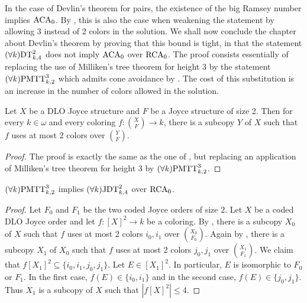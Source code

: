In the case of Devlin's theorem for pairs, the existence of the big Ramsey number implies $\mathrm{ACA}_0$. By , this is also the case when weakening the statement by allowing 3 instead of 2 colors in the solution.  We shall now conclude the chapter about Devlin's theorem by proving that this bound is tight, in that the statement $(\forall k)\mathrm{DT}^{2}_{k, 4}$ does not imply $\mathrm{ACA}_0$ over $\mathrm{RCA}_0$. The proof consists essentially of replacing the use of Milliken's tree theorem for height 3 by the statement $(\forall k)\mathrm{PMTT}^{3}_{k,2}$ which admits cone avoidance by . The cost of this substitution is an increase in the number of colors allowed in the solution.

\begin{theorem}\label{thm:dt2to4-one-embedding-type-cone-avoidance}
Let $X$ be a DLO Joyce structure and $F$ be a Joyce structure of size 2. Then for every $k \in \omega$ and every coloring $f: {X \choose F} \to k$,
there is a subcopy $Y$ of $X$ such that $f$ uses at most 2 colors over ${Y \choose F}$.
\end{theorem}
\begin{proof}
The proof is exactly the same as the one of ,
but replacing an application of Milliken's tree theorem for height 3 by
$(\forall k)\mathrm{PMTT}^{3}_{k,2}$.
\end{proof}

\begin{theorem}\label{thm:pmt-to-dt-more-colors}
$(\forall k)\mathrm{PMTT}^{3}_{k,2}$ implies $(\forall k)\mathrm{JDT}^{2}_{k, 4}$ over $\mathrm{RCA}_0$.
\end{theorem}
\begin{proof}
Let $F_0$ and $F_1$ be the two coded Joyce orders of size $2$.
Let $X$ be a coded DLO Joyce order and let $f: [X]^2 \to k$ be a coloring.
By ,
there is a subcopy $X_0$ of $X$ such that $f$ uses at most 2 colors $i_0, i_1$ over ${X_0 \choose F_0}$.
Again by ,
there is a subcopy $X_1$ of $X_0$ such that $f$ uses at most 2 colors $j_0, j_1$ over ${X_1 \choose F_1}$.
We claim that $f[X_1]^2 \subseteq \{i_0, i_1, j_0, j_1\}$. Let $E \in [X_1]^2$. In particular, $E$ is isomorphic to $F_0$ or $F_1$. In the first case, $f(E) \in \{i_0, i_1\}$ and in the second case, $f(E) \in \{j_0, j_1\}$.
Thus $X_1$ is a subcopy of $X$ such that $|f[X]^2| \leq 4$.
\end{proof}


